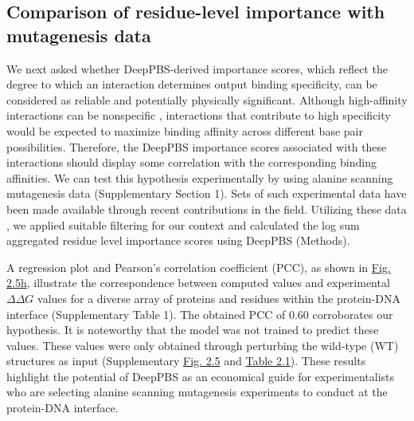 \subsection{Comparison of residue-level importance with mutagenesis data}
We next asked whether DeepPBS-derived importance scores, which reflect the degree to which an interaction determines output binding specificity, can be considered as reliable and potentially physically significant. Although high-affinity interactions can be nonspecific \citep{Agback1998, Peterson2007}, interactions that contribute to high specificity would be expected to maximize binding affinity across different base pair possibilities. Therefore, the DeepPBS importance scores associated with these interactions should display some correlation with the corresponding binding affinities. We can test this hypothesis experimentally by using alanine scanning mutagenesis data (Supplementary Section 1). Sets of such experimental data have been made available through recent contributions\citep{Ovek2022} in the field. Utilizing these data \citep{Peng2018}, we applied suitable filtering for our context and calculated the log sum aggregated residue level importance scores using DeepPBS (Methods).
\par
A regression plot and Pearson’s correlation coefficient (PCC), as shown in \hyperref[fig:pdna4]{Fig. 2.5h}, illustrate the correspondence between computed values and experimental $\Delta\Delta G$ values for a diverse array of proteins and residues within the protein-DNA interface (Supplementary Table 1). The obtained PCC of 0.60 corroborates our hypothesis. It is noteworthy that the model was not trained to predict these values. These values were only obtained through perturbing the wild-type (WT) structures as input (Supplementary \hyperref[fig:pdna4]{Fig. 2.5} and \hyperref[table:pdna1]{Table 2.1}). These results highlight the potential of DeepPBS as an economical guide for experimentalists who are selecting alanine scanning mutagenesis experiments to conduct at the protein-DNA interface.

